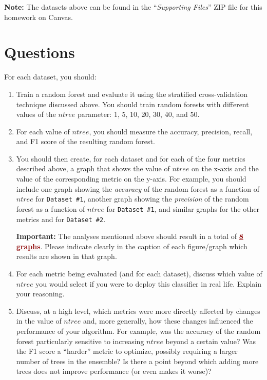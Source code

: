 \documentclass{article}
\begin{document}
\begin{mybox}[boxblue] 
\textbf{Note:} The datasets above can be found in the ``\textit{Supporting Files}'' ZIP file for this homework on Canvas.
\end{mybox}







\vspace{0.7cm}
\section{Questions}

For each dataset, you should:

\begin{enumerate}
    \item Train a random forest and evaluate it using the stratified cross-validation technique discussed above. You should train random forests with different values of the $ntree$ parameter: 1, 5, 10, 20, 30, 40, and 50.
    \item For each value of $ntree$, you should measure the accuracy, precision, recall, and F1 score of the resulting random forest. 
    \item You should then create, for each dataset and for each of the four metrics described above, a graph that shows the value of $ntree$ on the x-axis and the value of the corresponding metric on the y-axis. For example, you should include one graph showing the \textit{accuracy} of the random forest as a function of $ntree$ for \texttt{Dataset \#1}, another graph showing the \textit{precision} of the random forest as a function of $ntree$ for \texttt{Dataset \#1}, and similar graphs for the other metrics and for \texttt{Dataset \#2}.
    \begin{mybox}[boxpink] 
    \textbf{Important:} The analyses mentioned above should result in a total of \textcolor{darkred}{\ul{\textbf{8 graphs}}}. Please indicate clearly in the caption of each figure/graph which results are shown in that graph.
    \end{mybox}
    \item For each metric being evaluated (and for each dataset), discuss which value of $ntree$ you would select if you were to deploy this classifier in real life. Explain your reasoning. 
    \item Discuss, at a high level, which metrics were more directly affected by changes in the value of $ntree$ and, more generally, how these changes influenced the performance of your algorithm. For example, was the accuracy of the random forest particularly sensitive to increasing $ntree$ beyond a certain value? Was the F1 score a ``harder'' metric to optimize, possibly requiring a larger number of trees in the ensemble? Is there a point beyond which adding more trees does not improve performance (or even makes it worse)?
\end{enumerate}
\end{document}

